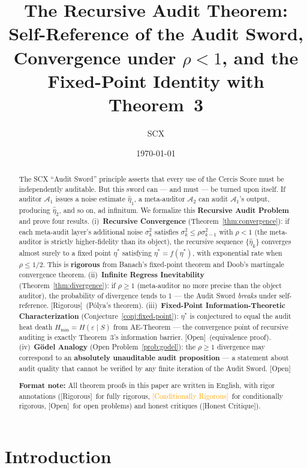 \documentclass[12pt,a4paper]{article}
\title{\bfseries The Recursive Audit Theorem:\\
Self-Reference of the Audit Sword,\\
Convergence under $\rho<1$, and the\\
Fixed-Point Identity with Theorem~3}
\author{SCX}
\date{\today}
\newcommand{\rigorous}{\textcolor{green!50!black}{\small\textsf{[Rigorous]}}}
\newcommand{\conditionallyrigorous}{\textcolor{orange}{\small\textsf{[Conditionally Rigorous]}}}
\newcommand{\openquest}{\textcolor{red!70!black}{\small\textsf{[Open]}}}
\newcommand{\honestcritique}{\textcolor{blue!60!black}{\small\textsf{[Honest Critique]}}}
\newcommand{\cA}{\mathcal{A}}
\begin{document}
\maketitle

\begin{abstract}
The \textsf{SCX} ``Audit Sword'' principle asserts that every use of the Cercis Score
must be independently auditable.  But this sword can --- and must --- be turned
upon itself.  If auditor $\cA_1$ issues a noise estimate $\hat{\eta}_1$, a
meta-auditor $\cA_2$ can audit $\cA_1$'s output, producing $\hat{\eta}_2$,
and so on, ad infinitum.  We formalize this \textbf{Recursive Audit Problem}
and prove four results.  (i)~\textbf{Recursive Convergence}
(Theorem~\ref{thm:convergence}): if each meta-audit layer's additional noise
$\sigma_k^2$ satisfies $\sigma_k^2\leq\rho\sigma_{k-1}^2$ with $\rho<1$ (the
meta-auditor is strictly higher-fidelity than its object), the recursive
sequence $\{\hat{\eta}_k\}$ converges almost surely to a fixed point $\eta^*$
satisfying $\eta^*=f(\eta^*)$, with exponential rate when $\rho\leq1/2$.  This
is \textbf{rigorous} from Banach's fixed-point theorem and Doob's martingale
convergence theorem.  (ii)~\textbf{Infinite Regress Inevitability}
(Theorem~\ref{thm:divergence}): if $\rho\geq1$ (meta-auditor no more precise
than the object auditor), the probability of divergence tends to 1 --- the Audit
Sword \emph{breaks} under self-reference.  \rigorous~(P\'olya's theorem).
(iii)~\textbf{Fixed-Point Information-Theoretic Characterization}
(Conjecture~\ref{conj:fixed-point}): $\eta^*$ is conjectured to equal the
audit heat death $H_{\min}=H(\varepsilon\mid S)$ from AE-Theorem --- the
convergence point of recursive auditing is exactly Theorem~3's information
barrier.  \openquest~(equivalence proof).  (iv)~\textbf{G\"odel Analogy}
(Open Problem~\ref{prob:godel}): the $\rho\geq1$ divergence may correspond to
an \textbf{absolutely unauditable audit proposition} --- a statement about audit
quality that cannot be verified by any finite iteration of the Audit Sword.
\openquest

\medskip\noindent
\textbf{Format note:} All theorem proofs in this paper are written in English, with rigor annotations (\rigorous~for fully rigorous, \conditionallyrigorous~for conditionally rigorous, \openquest~for open problems) and honest critiques (\honestcritique).
\end{abstract}

\section{Introduction}
\end{document}
